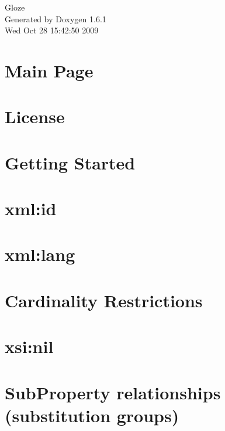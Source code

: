 \documentclass[a4paper]{article}
\begin{document}
\hypersetup{pageanchor=false}
\begin{titlepage}
\vspace*{7cm}
\begin{center}
{\Large Gloze }\\
\vspace*{1cm}
{\large Generated by Doxygen 1.6.1}\\
\vspace*{0.5cm}
{\small Wed Oct 28 15:42:50 2009}\\
\end{center}
\end{titlepage}
\tableofcontents
{}
\hypersetup{pageanchor=true}
\section{Main Page}
\label{index}\hypertarget{index}{}
\section{License}
\label{license}
\hypertarget{license}{}

\section{Getting Started}
\label{gettingStarted}
\hypertarget{gettingStarted}{}

\section{xml:id}
\label{id}
\hypertarget{id}{}

\section{xml:lang}
\label{lang}
\hypertarget{lang}{}

\section{Cardinality Restrictions}
\label{cardinality}
\hypertarget{cardinality}{}

\section{xsi:nil}
\label{nil}
\hypertarget{nil}{}

\section{SubProperty relationships (substitution groups)}
\label{substitution}
\hypertarget{substitution}{}

\end{document}
